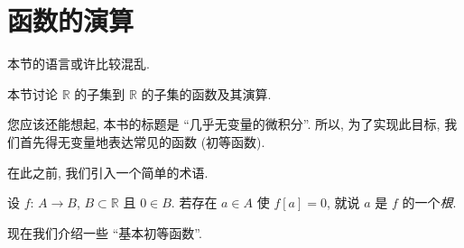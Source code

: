 \section{函数的演算}

\begin{remark*}
    本节的语言或许比较混乱.
\end{remark*}

本节讨论 $\mathbb{R}$ 的子集到 $\mathbb{R}$ 的子集的函数及其演算.

您应该还能想起, 本书的标题是 ``几乎无变量的微积分''. 所以, 为了实现此目标, 我们首先得无变量地表达常见的函数 (初等函数).

在此之前, 我们引入一个简单的术语.

\begin{definition}
    设 $f$: $A \to B$, $B \subset \mathbb{R}$ 且 $0 \in B$. 若存在 $a \in A$ 使 $f[a] = 0$, 就说 $a$ 是 $f$ 的一个\emph{根}.
\end{definition}

现在我们介绍一些 ``基本初等函数''.

